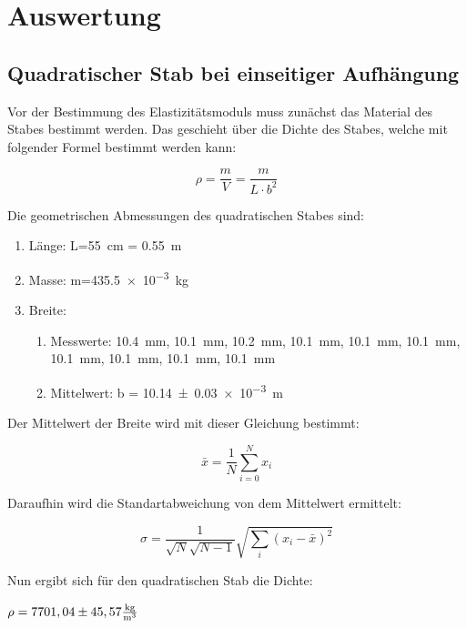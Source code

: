 \section{Auswertung}
\subsection{Quadratischer Stab bei einseitiger Aufhängung}

Vor der Bestimmung des Elastizitätsmoduls muss zunächst das Material des Stabes bestimmt werden.
Das geschieht über die Dichte des Stabes, welche mit folgender Formel bestimmt werden kann:

\begin{equation}
  \rho = \frac{m}{V} = \frac{m}{L \cdot b^2}
\end{equation}

Die geometrischen Abmessungen des quadratischen Stabes sind:

\begin{enumerate}
  \item Länge: L=\SI{55}{\centi\meter} = \SI{0.55}{\meter}
  \item Masse: m=\SI{435.5e-3}{\kilo\gram}
  \item Breite:
    \begin{enumerate}
      \item Messwerte: \SI{10.4}{\milli\meter}, \SI{10.1}{\milli\meter},
      \SI{10.2}{\milli\meter}, \SI{10.1}{\milli\meter}, \SI{10.1}{\milli\meter},
      \SI{10.1}{\milli\meter}, \SI{10.1}{\milli\meter},
      \SI{10.1}{\milli\meter}, \SI{10.1}{\milli\meter}, \SI{10.1}{\milli\meter}
      \item Mittelwert: b = \SI{10.14(3)e-3}{\meter}
    \end{enumerate}
\end{enumerate}

Der Mittelwert der Breite wird mit dieser Gleichung bestimmt:

\begin{equation}
  \bar{x} = \frac{1}{N} \sum_{i=0}^{N} x_i
\end{equation}

Daraufhin wird die Standartabweichung von dem Mittelwert ermittelt:

\begin{equation}
  \sigma = \frac{1}{\sqrt{N}\sqrt{N-1}} \sqrt{\sum_{i}(x_i-\bar{x})^2}
\end{equation}

Nun ergibt sich für den quadratischen Stab die Dichte:\\
\centerline{$\rho = 7701,04 \pm 45,57 \si[per-mode=fraction]{\kilo\gram\per\metre\tothe{3}}$}

